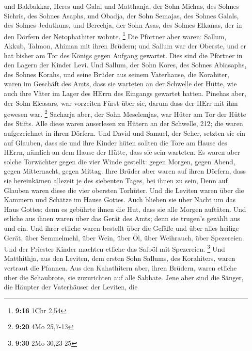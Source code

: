  und Bakbakkar, Heres und Galal und Matthanja, der Sohn
Michas, des Sohnes Sichris, des Sohnes Asaphs,  und Obadja,
der Sohn Semajas, des Sohnes Galals, des Sohnes Jeduthuns, und Berechja,
der Sohn Asas, des Sohnes Elkanas, der in den Dörfern der Netophathiter
wohnte. \footnote{\textbf{9:16} 1Chr 2,54}  Die Pförtner
aber waren: Sallum, Akkub, Talmon, Ahiman mit ihren Brüdern; und Sallum
war der Oberste,  und er hat bisher am Tor des Königs gegen
Aufgang gewartet. Dies sind die Pförtner in den Lagern der Kinder Levi.
 Und Sallum, der Sohn Kores, des Sohnes Abiasaphs, des
Sohnes Korahs, und seine Brüder aus seinem Vaterhause, die Korahiter,
waren im Geschäft des Amts, dass sie warteten an der Schwelle der Hütte,
wie auch ihre Väter im Lager des HErrn des Eingangs gewartet hatten.
 Pinehas aber, der Sohn Eleasars, war vorzeiten Fürst über
sie, darum dass der HErr mit ihm gewesen war. \footnote{\textbf{9:20}
  4Mo 25,7-13}  Sacharja aber, der Sohn Meselemjas, war
Hüter am Tor der Hütte des Stifts.  Alle diese waren
auserlesen zu Hütern an der Schwelle, 212; die waren aufgezeichnet in
ihren Dörfern. Und David und Samuel, der Seher, setzten sie ein auf
Glauben,  dass sie und ihre Kinder hüten sollten die Tore
am Hause des HErrn, nämlich an dem Hause der Hütte, dass sie sein
warteten.  Es waren aber solche Torwächter gegen die vier
Winde gestellt: gegen Morgen, gegen Abend, gegen Mitternacht, gegen
Mittag.  Ihre Brüder aber waren auf ihren Dörfern, dass sie
hereinkämen allezeit je des siebenten Tages, bei ihnen zu sein,
 Denn auf Glauben waren diese die vier obersten Torhüter.
Und die Leviten waren über die Kammern und Schätze im Hause Gottes.
 Auch blieben sie über Nacht um das Haus Gottes; denn es
gebührte ihnen die Hut, dass sie alle Morgen auftäten.  Und
etliche aus ihnen waren über das Gerät des Amts; denn sie trugen's
gezählt aus und ein.  Und ihrer etliche waren bestellt über
die Gefäße und über alles heilige Gerät, über Semmelmehl, über Wein,
über Öl, über Weihrauch, über Spezereien.  Und der Priester
Kinder machten etliche das Salböl mit Spezereien. \footnote{\textbf{9:30}
  2Mo 30,23-25}  Und Matthithja, aus den Leviten, dem
ersten Sohn Sallums, des Korahiters, waren vertraut die Pfannen.
 Aus den Kahathitern aber, ihren Brüdern, waren etliche
über die Schaubrote, sie zuzurichten auf alle Sabbate. 
Jene aber sind die Sänger, die Häupter der Vaterhäuser der Leviten, die
